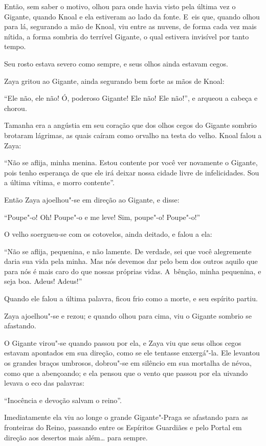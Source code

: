 Então, sem saber o motivo, olhou para onde havia visto pela última vez o
Gigante, quando Knoal e ela estiveram ao lado da fonte. E~eis que, quando
olhou para lá, segurando a mão de Knoal, viu entre as nuvens, de
forma cada vez mais nítida, a forma sombria do terrível Gigante, o qual
estivera invisível por tanto tempo.

Seu rosto estava severo como sempre, e seus olhos ainda estavam cegos.

Zaya gritou ao Gigante, ainda segurando bem forte as mãos de Knoal:

``Ele não, ele não! Ó, poderoso Gigante! Ele não! Ele não!'', e arqueou
a cabeça e chorou.

Tamanha era a angústia em seu coração que dos olhos cegos do Gigante
sombrio brotaram lágrimas, as quais caíram como orvalho na testa do
velho. Knoal falou a Zaya:

``Não se aflija, minha menina. Estou contente por você ver novamente o
Gigante, pois tenho esperança de que ele irá deixar nossa cidade livre
de infelicidades. Sou a última vítima, e morro contente''.

Então Zaya ajoelhou"-se em direção ao Gigante, e disse:

``Poupe"-o! Oh! Poupe"-o e me leve! Sim, poupe"-o! Poupe"-o!''

O velho soergueu-se com os cotovelos, ainda deitado, e falou a ela:

``Não se aflija, pequenina, e não lamente. De verdade, sei que você
alegremente daria sua vida pela minha. Mas nós devemos dar pelo bem dos
outros aquilo que para nós é mais caro do que nossas próprias vidas. A~bênção, minha pequenina, e seja boa. Adeus! Adeus!''

Quando ele falou a última palavra, ficou frio como a morte, e seu
espírito partiu.

Zaya ajoelhou"-se e rezou; e quando olhou para cima, viu o Gigante
sombrio se afastando.

O Gigante virou"-se quando passou por ela, e Zaya viu que seus olhos
cegos estavam apontados em sua direção, como se ele tentasse enxergá"-la.
Ele levantou os grandes braços umbrosos, dobrou"-se em silêncio em sua
mortalha de névoa, como que a abençoando; e ela pensou que o vento que
passou por ela uivando levava o eco das palavras:

``Inocência e devoção salvam o reino''.

\smallskip
Imediatamente ela viu ao longe o grande Gigante"-Praga se afastando para
as fronteiras do Reino, passando entre os Espíritos Guardiães e pelo
Portal em direção aos desertos mais além… para sempre.
